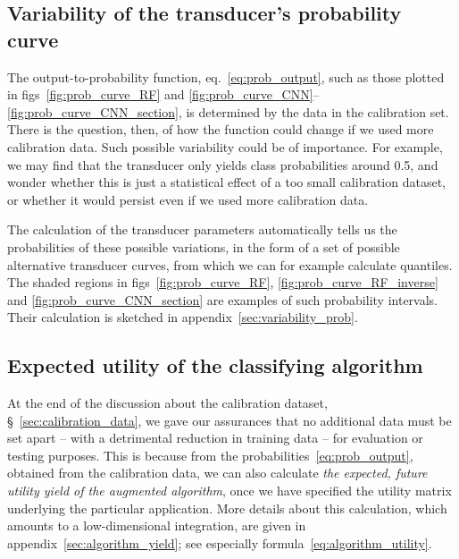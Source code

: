 \documentclass[\ifafour a4paper,12pt,\else a5paper,10pt,\fi%
onecolumn,oneside,article,%
british%
]{memoir}
\theoremstyle{remark}
\theoremstyle{innote}
\renewcommand*{\|}[1][]{\nonscript\:#1\vert\nonscript\:\mathopen{}}
\newcommand*{\sect}{\S}%
\newcommand*{\eqn}{eq.}%
\newcommand*{\figs}{figs}%
\begin{document}
\subsection{Variability of the transducer's probability curve}
\label{sec:variability_curve}

The output-to-probability function, \eqn~\eqref{eq:prob_output}, such as those plotted in \figs~\ref{fig:prob_curve_RF} and \ref{fig:prob_curve_CNN}--\ref{fig:prob_curve_CNN_section}, is determined by the data in the calibration set. There is the question, then, of how the function could change if we used more calibration data. Such possible variability could be of importance. For example, we may find that the transducer only yields class probabilities around 0.5, and wonder whether this is just a statistical effect of a too small calibration dataset, or whether it would persist even if we used more calibration data.

The calculation of the transducer parameters automatically tells us the probabilities of these possible variations, in the form of  a set of possible alternative transducer curves, from which we can for example calculate quantiles. The shaded regions in \figs~\ref{fig:prob_curve_RF}, \ref{fig:prob_curve_RF_inverse} and \ref{fig:prob_curve_CNN_section} are examples of such probability intervals. Their calculation is sketched in appendix~\ref{sec:variability_prob}.

\subsection{Expected utility of the classifying algorithm}
\label{sec:yield_of_classifier}

At the end of the discussion about the calibration dataset, \sect~\ref{sec:calibration_data}, we gave our assurances that no additional data must be set apart -- with a detrimental reduction in training data -- for evaluation or testing purposes. This is because from the probabilities~\eqref{eq:prob_output}, obtained from the calibration data, we can also calculate \emph{the expected, future utility yield of the augmented algorithm}, once we have specified the utility matrix underlying the particular application. More details about this calculation, which amounts to a low-dimensional integration, are given in appendix~\ref{sec:algorithm_yield}; see especially formula~\eqref{eq:algorithm_utility}.
\end{document}

